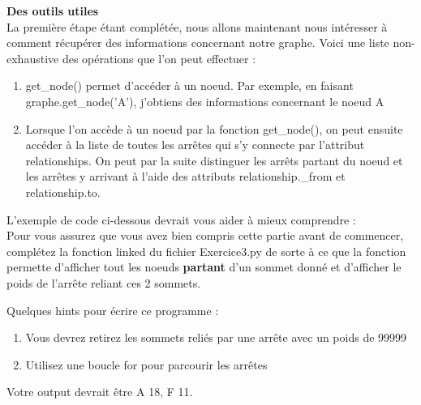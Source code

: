 \begin{Exercice}[10 minutes]\textbf{Des outils utiles}\\
    La première étape étant complétée, nous allons maintenant nous intéresser à comment récupérer des informations concernant notre graphe. Voici une liste non-exhaustive des opérations que l'on peut effectuer :\\
    \begin{enumerate}
        \item get\_node() permet d'accéder à un noeud. Par exemple, en faisant graphe.get\_node('A'), j'obtiens des informations concernant le noeud A
        \item Lorsque l'on accède à un noeud par la fonction get\_node(), on peut ensuite accéder à la liste de toutes les arrêtes qui s'y connecte par l'attribut relationships. On peut par la suite distinguer les arrêts partant du noeud et les arrêtes y arrivant à l'aide des attributs relationship.\_from et relationship.to.
    \end{enumerate}
    
    L'exemple de code ci-dessous devrait vous aider à mieux comprendre :
    \\
    
    Pour vous assurez que vous avez bien compris cette partie avant de commencer, complétez la fonction linked du fichier Exercice3.py de sorte à ce que la fonction permette d'afficher tout les noeuds \textbf{partant} d'un sommet donné et d'afficher le poids de l'arrête reliant ces 2 sommets.\\
    
    
    \begin{conseil}
        Quelques hints pour écrire ce programme :
        \begin{enumerate}
            \item Vous devrez retirez les sommets reliés par une arrête avec un poids de 99999
            \item Utilisez une boucle for pour parcourir les arrêtes
        \end{enumerate}
    Votre output devrait être A 18, F 11.
    \end{conseil}
    \begin{solution}
        
    \end{solution}
\end{Exercice}
\newpage
